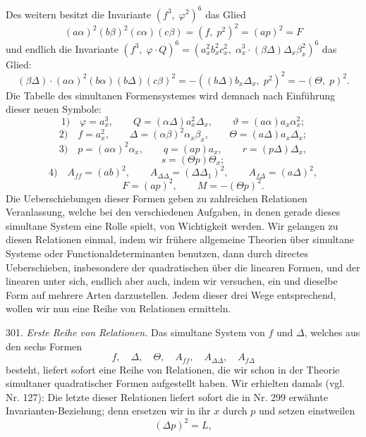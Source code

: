 Des weitern besitzt die Invariante $(f^3, \; \varphi^2)^6$ das Glied
\[
(a\alpha)^2(b\beta)^2(c\alpha)(c\beta) = (f, \; p^2)^2 = (ap)^2 = F
\]
und endlich die Invariante $(f^3, \; \varphi \cdot Q)^6 = (a_x^2 b_x^2 c_x^2, \; \alpha_x^3 \cdot (\beta\Delta)\Delta_x \beta_x^2)^6$ das Glied:
\[
(\beta\Delta) \cdot (a\alpha)^2(b\alpha)(b\Delta)(c\beta)^2 = -((b\Delta)b_x\Delta_x, \; p^2)^2 = -(\Theta, \; p)^2.
\]
Die Tabelle des simultanen Formensystemes wird demnach nach Einführung dieser neuen Symbole:
\[
1) \quad \varphi = a_x^3, \qquad Q = (\alpha\Delta)a_x^2\Delta_x, \qquad \vartheta = (a\alpha)a_x\alpha_x^2;
\]
\[
2) \quad f = a_x^2, \qquad \Delta = (\alpha\beta)^2\alpha_x\beta_x, \qquad \Theta = (a\Delta)a_x\Delta_x;
\]
\[
3) \quad p = (a\alpha)^2\alpha_x, \qquad q = (ap)a_x, \qquad r = (p\Delta)\Delta_x,
\]
\[
\qquad s = (\Theta p)\Theta_x;
\]
\[
4) \quad A_{ff} = (ab)^2, \qquad A_{\Delta\Delta} = (\Delta\Delta_1)^2, \qquad A_{f\Delta} = (a\Delta)^2,
\]
\[
\qquad F = (ap)^2, \qquad M = -(\Theta p)^2.
\]
Die Ueberschiebungen dieser Formen geben zu zahlreichen Relationen Veranlassung, welche bei den verschiedenen Aufgaben, in denen gerade dieses simultane System eine Rolle spielt, von Wichtigkeit werden. Wir gelangen zu diesen Relationen einmal, indem wir frühere allgemeine Theorien über simultane Systeme oder Functionaldeterminanten benutzen, dann durch directes Ueberschieben, insbesondere der quadratischen über die linearen Formen, und der linearen unter sich, endlich aber auch, indem wir versuchen, ein und dieselbe Form auf mehrere Arten darzustellen. Jedem dieser drei Wege entsprechend, wollen wir nun eine Reihe von Relationen ermitteln.

301. \textit{Erste Reihe von Relationen.} Das simultane System von $f$ und $\Delta$, welches aus den sechs Formen
\[
f, \quad \Delta, \quad \Theta, \quad A_{ff}, \quad A_{\Delta\Delta}, \quad A_{f\Delta}
\]
besteht, liefert sofort eine Reihe von Relationen, die wir schon in der Theorie simultaner quadratischer Formen aufgestellt haben. Wir erhielten damals (vgl. Nr. 127):
Die letzte dieser Relationen liefert sofort die in Nr. 299 erwähnte Invarianten-Beziehung; denn ersetzen wir in ihr $x$ durch $p$ und setzen einstweilen
\[
(\Delta p)^2 = L,
\]


